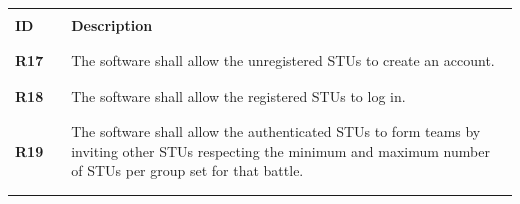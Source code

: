 \renewcommand{\arraystretch}{0.5}
\begin{longtable}[H]{l l p{12cm}}
    \hline
                 &        &                                                                                                                                                                                                                       \\
    \textbf{ID}  & \vline & \textbf{Description}                                                                                                                                                                                                  \\
                 &        &                                                                                                                                                                                                                       \\\hline & & \\
    \textbf{R17} & \vline & The software shall allow the unregistered STUs to create an account.                                                                                                                                                  \\
                 &        &                                                                                                                                                                                                                       \\\hline & & \\
    \textbf{R18} & \vline & The software shall allow the registered STUs to log in.                                                                                                                                                               \\
                 &        &                                                                                                                                                                                                                       \\\hline & & \\
    \textbf{R19} & \vline & The software shall allow the authenticated STUs to form teams by inviting other STUs respecting the minimum and maximum number of STUs per group set for that battle.                                                 \\
                 &        &                                                                                                                                                                                                                       \\\hline & & \\

\end{longtable}
